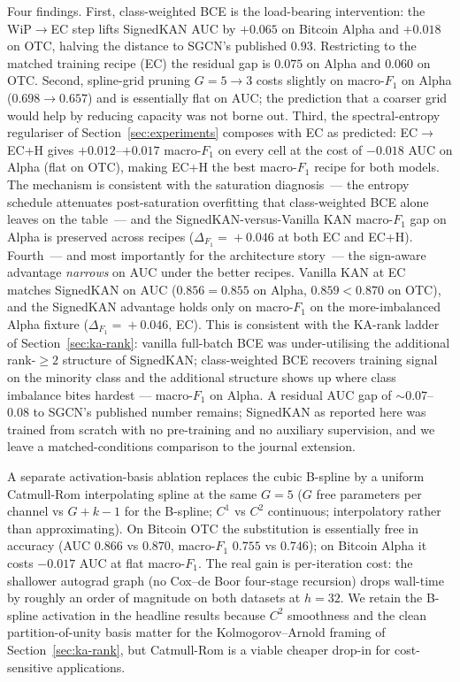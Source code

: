Four findings. First, class-weighted BCE is the load-bearing
intervention: the WiP$\to$EC step lifts SignedKAN AUC by
$+0.065$ on Bitcoin Alpha and $+0.018$ on OTC, halving the
distance to SGCN's published $0.93$. Restricting to the matched
training recipe (EC) the residual gap is $0.075$ on Alpha and
$0.060$ on OTC. Second, spline-grid pruning $G\!=\!5\!\to\!3$
costs slightly on macro-$F_1$ on Alpha ($0.698\!\to\!0.657$)
and is essentially flat on AUC; the prediction that a coarser
grid would help by reducing capacity was not borne out. Third,
the spectral-entropy regulariser of
Section~\ref{sec:experiments} composes with EC as predicted:
EC$\to$EC+H gives $+0.012$--$+0.017$ macro-$F_1$ on every cell
at the cost of $-0.018$ AUC on Alpha (flat on OTC), making
EC+H the best macro-$F_1$ recipe for both models. The
mechanism is consistent with the saturation diagnosis~--- the
entropy schedule attenuates post-saturation overfitting that
class-weighted BCE alone leaves on the table~--- and the
SignedKAN-versus-Vanilla KAN macro-$F_1$ gap on Alpha is
preserved across recipes ($\Delta_{F_1}\!=\!+0.046$ at both
EC and EC+H). Fourth~--- and most importantly for the
architecture story~--- the sign-aware advantage \emph{narrows}
on AUC under the better recipes. Vanilla KAN at EC matches
SignedKAN on AUC ($0.856\!=\!0.855$ on Alpha, $0.859\!<\!0.870$
on OTC), and the SignedKAN advantage holds only on
macro-$F_1$ on the more-imbalanced Alpha fixture
($\Delta_{F_1}\!=\!+0.046$, EC). This is consistent with the
KA-rank ladder of Section~\ref{sec:ka-rank}: vanilla full-batch
BCE was under-utilising the additional rank-$\geq\!2$ structure
of SignedKAN; class-weighted BCE recovers training signal on
the minority class and the additional structure shows up where
class imbalance bites hardest --- macro-$F_1$ on Alpha. A residual
AUC gap of $\sim\!0.07$--$0.08$ to SGCN's published number remains;
SignedKAN as reported here was trained from scratch with no
pre-training and no auxiliary supervision, and we leave a
matched-conditions comparison to the journal extension.

A separate activation-basis ablation replaces the cubic B-spline by
a uniform Catmull-Rom interpolating spline at the same $G\!=\!5$
($G$ free parameters per channel vs $G + k - 1$ for the B-spline;
$C^1$ vs $C^2$ continuous; interpolatory rather than approximating).
On Bitcoin OTC the substitution is essentially free in accuracy
(AUC $0.866$ vs $0.870$, macro-$F_1$ $0.755$ vs $0.746$); on
Bitcoin Alpha it costs $-0.017$ AUC at flat macro-$F_1$. The real
gain is per-iteration cost: the shallower autograd graph (no Cox--de
Boor four-stage recursion) drops wall-time by roughly an order of
magnitude on both datasets at $h\!=\!32$. We retain the B-spline
activation in the headline results because $C^2$ smoothness and the
clean partition-of-unity basis matter for the Kolmogorov--Arnold
framing of Section~\ref{sec:ka-rank}, but Catmull-Rom is a viable
cheaper drop-in for cost-sensitive applications.


